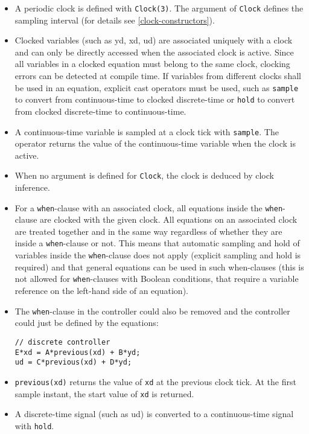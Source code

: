 \begin{itemize}
\item
  A periodic clock is defined with \lstinline!Clock(3)!. The argument
  of \lstinline!Clock! defines the sampling interval (for details see \cref{clock-constructors}).
\item
  Clocked variables (such as yd, xd, ud) are associated uniquely
  with a clock and can only be directly accessed when the associated
  clock is active. Since all variables in a clocked equation must belong
  to the same clock, clocking errors can be detected at compile time. If
  variables from different clocks shall be used in an equation, explicit
  cast operators must be used, such as \lstinline!sample! to convert
  from continuous-time to clocked discrete-time or \lstinline!hold! to
  convert from clocked discrete-time to continuous-time.
\item
  A continuous-time variable is sampled at a clock tick with
  \lstinline!sample!. The operator returns the value of the
  continuous-time variable when the clock is active.
\item
  When no argument is defined for \lstinline!Clock!, the clock is
  deduced by clock inference.
\item
  For a \lstinline!when!-clause with an associated clock, all
  equations inside the \lstinline!when!-clause are clocked with the given
  clock. All equations on an associated clock are treated together and
  in the same way regardless of whether they are inside a
  \lstinline!when!-clause or not. This means that automatic sampling and
  hold of variables inside the \lstinline!when!-clause does not apply
  (explicit sampling and hold is required) and that general equations
  can be used in such when-clauses (this is not allowed for
  \lstinline!when!-clauses with Boolean conditions, that require a variable
  reference on the left-hand side of an equation).
\item
  The \lstinline!when!-clause in the controller could also be removed
  and the controller could just be defined by the equations:
\begin{lstlisting}[language=modelica]
// discrete controller
E*xd = A*previous(xd) + B*yd;
ud = C*previous(xd) + D*yd;
\end{lstlisting}
\item
  \lstinline!previous(xd)! returns the value of \lstinline!xd! at
  the previous clock tick. At the first sample instant, the start value
  of \lstinline!xd! is returned.
\item
  A discrete-time signal (such as ud) is converted to a continuous-time signal with \lstinline!hold!.

\end{itemize}
